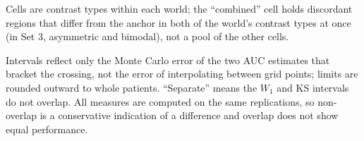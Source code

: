 \documentclass[AMA,Times1COL]{WileyNJDv5}
\begin{document}
\begin{table}[ht]
\centering
\caption{Per-region sample size at which selection AUC reaches 0.9, by cell and measure, interpolated on $\log n$ over the grid $n = 25$--2{,}000, with 95\% Monte Carlo intervals from the delta method applied to the log-$n$ interpolation. Cells whose AUC stays at chance (--) across the full grid are marked ``blind''; $\leq 25$ marks a target reached at the smallest grid size, where no interval is available, and such a cell counts as separated when 25 lies below the other measure's lower limit.\label{tab:study2_required_n_mc}}
\begin{tablenotes}
\item Cells are contrast types within each world; the ``combined'' cell holds discordant regions that differ from the anchor in both of the world's contrast types at once (in Set 3, asymmetric and bimodal), not a pool of the other cells.
\item Intervals reflect only the Monte Carlo error of the two AUC estimates that bracket the crossing, not the error of interpolating between grid points; limits are rounded outward to whole patients. ``Separate'' means the $W_1$ and KS intervals do not overlap. All measures are computed on the same replications, so non-overlap is a conservative indication of a difference and overlap does not show equal performance.
\end{tablenotes}
\end{table}

\end{document}

